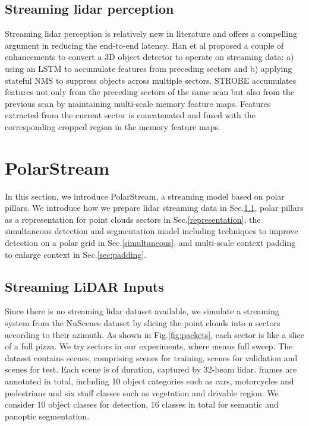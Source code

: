 \documentclass{article}
\begin{document}
\vspace{-3mm}\subsection{Streaming lidar perception}\vspace{-2mm}

Streaming lidar perception is relatively new in literature and offers a compelling argument in reducing the end-to-end latency. Han et al \cite{han2020streaming} proposed a couple of enhancements to convert a 3D object detector to operate on streaming data: a) using an LSTM to accumulate features from preceding sectors and b) applying stateful NMS to suppress objects across multiple sectors. STROBE \cite{frossard2020strobe} accumulates features not only from the preceding sectors of the same scan but also from the previous scan by maintaining multi-scale memory feature maps. Features extracted from the current sector is concatenated and fused with the corresponding cropped region in the memory feature maps.

\vspace{-3mm}\section{PolarStream}
\label{methods}\vspace{-3mm}

In this section, we introduce PolarStream, a streaming model based on polar pillars. We introduce how we prepare lidar streaming data in Sec.\ref{input}, polar pillars as a representation for point clouds sectors in Sec.\ref{representation}, the simultaneous detection and segmentation model including techniques to improve detection on a polar grid in Sec.\ref{simultaneous}, and multi-scale context padding to enlarge context in Sec.\ref{sec:padding}. 

\vspace{-4mm}\subsection{Streaming LiDAR Inputs}\label{input}\vspace{-2mm}
Since there is no streaming lidar dataset available, we simulate a streaming system from the NuScenes dataset \cite{caesar2019nuscenes} by slicing the point clouds into n sectors according to their azimuth. As shown in Fig.\ref{fig:packets}, each sector is like a slice of a full pizza. We try  sectors in our experiments, where  means full sweep.  The dataset contains  scenes, comprising  scenes for training,  scenes for validation and  scenes for test. Each scene is of  duration, captured by 32-beam lidar.  frames are annotated in total, including 10 object categories such as cars, motorcycles and pedestrians and six stuff classes such as vegetation and drivable region. We consider 10 object classes for detection, 16 classes in total for semantic and panoptic segmentation.
\end{document}
